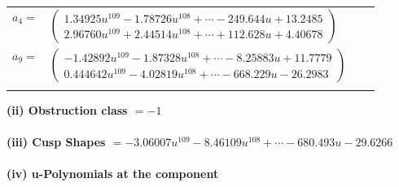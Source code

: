 \documentclass[1p]{elsarticle_modified}
\theoremstyle{definition}
\begin{document}
\begin{tabular}{m{7pt} m{180pt} m{7pt} m{180pt} }
\flushright $a_{4}=$&$\begin{pmatrix}1.34925 u^{109}-1.78726 u^{108}+\cdots-249.644 u+13.2485\\2.96760 u^{109}+2.44514 u^{108}+\cdots+112.628 u+4.40678\end{pmatrix}$ \\
\flushright $a_{9}=$&$\begin{pmatrix}-1.42892 u^{109}-1.87328 u^{108}+\cdots-8.25883 u+11.7779\\0.444642 u^{109}-4.02819 u^{108}+\cdots-668.229 u-26.2983\end{pmatrix}$\\&\end{tabular}
\flushleft \textbf{(ii) Obstruction class $= -1$}\\~\\
\flushleft \textbf{(iii) Cusp Shapes $= -3.06007 u^{109}-8.46109 u^{108}+\cdots-680.493 u-29.6266$}\\~\\
\newpage\renewcommand{\arraystretch}{1}
\flushleft \textbf{(iv) u-Polynomials at the component}\newline \\
\end{document}

